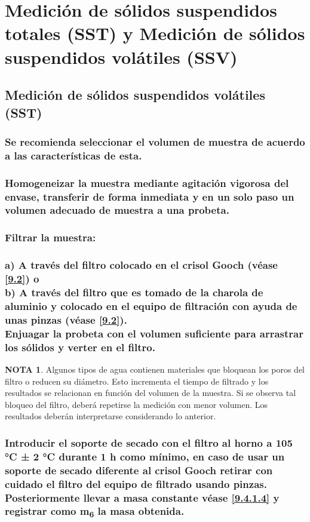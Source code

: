 \documentclass[spanish,12pt,letterpaper,titlepage]{article}
\theoremstyle{definition}
\newtheorem{teor}{NOTA}
\begin{document}
	\section{Medición de sólidos suspendidos totales (SST) y Medición de sólidos suspendidos volátiles (SSV)}\label{9.6}
	\subsection{Medición de sólidos suspendidos volátiles (SST)}\label{9.6.1}
	\subsubsection{Se recomienda seleccionar el volumen de muestra de acuerdo a las características de esta.}\label{9.6.1.1}
	\subsubsection{Homogeneizar la muestra mediante agitación vigorosa del envase, transferir de forma inmediata y en un solo paso un volumen adecuado de muestra a una probeta.}\label{9.6.1.2}
	\subsubsection{Filtrar la muestra:\\
	\\a) A través del filtro colocado en el crisol Gooch (véase \ref{9.2}) o\\ b) A través del filtro que es tomado de la charola de aluminio y colocado en el equipo de filtración con ayuda de unas pinzas (véase \ref{9.2}).
	\vspace{12pt}\\Enjuagar la probeta con el volumen suficiente para arrastrar los sólidos y verter en el filtro.}\label{9.6.1.3}
	\begin{teor}
		Algunos tipos de agua contienen materiales que bloquean los poros del filtro o reducen su diámetro. Esto incrementa el tiempo de filtrado y los resultados se relacionan en función del volumen de la muestra. Si se observa tal bloqueo del filtro, deberá repetirse la medición con menor volumen. Los resultados deberán interpretarse considerando lo anterior.
	\end{teor}
	\subsubsection{Introducir el soporte de secado con el filtro al horno a 105 °C ± 2 °C durante 1 h como mínimo, en caso de usar un soporte de secado diferente al crisol Gooch retirar con cuidado el filtro del equipo de filtrado usando pinzas. Posteriormente llevar a masa constante véase \ref{9.4.1.4} y registrar como m\textsubscript{6} la masa obtenida.}\label{9.6.1.4}
\end{document}
